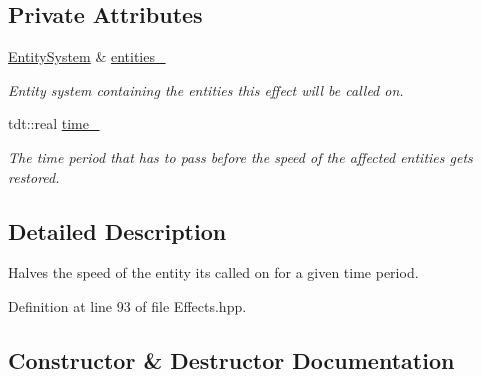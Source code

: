 \subsection*{Private Attributes}
\begin{DoxyCompactItemize}
\item 
\hyperlink{class_entity_system}{Entity\+System} \& \hyperlink{structutil_1_1effect_1_1_l_o_w_e_r___s_p_e_e_d___e_f_f_e_c_t_a139300dc0d6a1057cdec73bc4f984ad2}{entities\+\_\+}
\begin{DoxyCompactList}\small\item\em Entity system containing the entities this effect will be called on. \end{DoxyCompactList}\item 
tdt\+::real \hyperlink{structutil_1_1effect_1_1_l_o_w_e_r___s_p_e_e_d___e_f_f_e_c_t_a1de62813271d93d454f2fa3faba8ebdc}{time\+\_\+}
\begin{DoxyCompactList}\small\item\em The time period that has to pass before the speed of the affected entities gets restored. \end{DoxyCompactList}\end{DoxyCompactItemize}


\subsection{Detailed Description}
Halves the speed of the entity it\textquotesingle{}s called on for a given time period. 

Definition at line 93 of file Effects.\+hpp.



\subsection{Constructor \& Destructor Documentation}
